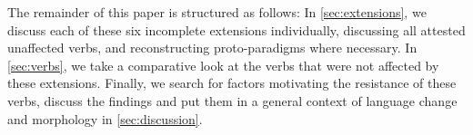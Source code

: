 The remainder of this paper is structured as follows:
In \cref{sec:extensions}, we discuss each of these six incomplete extensions individually, discussing all attested unaffected verbs, and reconstructing proto-paradigms where necessary.
In \cref{sec:verbs}, we take a comparative look at the verbs that were not affected by these extensions.
Finally, we search for factors motivating the resistance of these verbs, discuss the findings and put them in a general context of language change and morphology in \cref{sec:discussion}.



%
